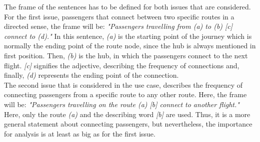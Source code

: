 \documentclass[conference]{IEEEtran}
\begin{document}
The frame of the sentences has to be defined for both issues that are considered. For the first issue, passengers that connect between two specific routes in a directed sense, the frame will be: \newline \emph{"Passengers travelling from (a) to (b) [c] connect to (d)."} \newline In this sentence, \emph{(a)} is the starting point of the journey which is normally the ending point of the route node, since the hub is always mentioned in first position. Then, \emph{(b)} is the hub, in which the passengers connect to the next flight. \emph{[c]} signifies the adjective, describing the frequency of connections and, finally, \emph{(d)} represents the ending point of the connection.\\
The second issue that is considered in the use case, describes the frequency of connecting passengers from a specific route to any other route. Here, the frame will be: \newline \emph{"Passengers travelling on the route (a) [b] connect to another flight."} \newline Here, only the route \emph{(a)} and the describing word \emph{[b]} are used. Thus, it is a more general statement about connecting passengers, but nevertheless, the importance for analysis is at least as big as for the first issue.
\end{document}
